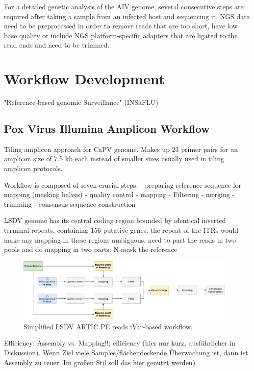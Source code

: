 For a detailed genetic analysis of the AIV genome, several consecutive steps are required after taking a sample from an infected host and sequencing it. NGS data need to be preprocessed in order to remove reads that are too short, have low base quality or include NGS platform-specific adapters that are ligated to the read ends and need to be trimmed.

\section{Workflow Development}
"Reference-based genomic Surveillance" (INSaFLU)

\subsection{Pox Virus Illumina Amplicon Workflow}

Tiling amplicon approach for CaPV genome. Makes up 23 primer pairs for an amplicon size of 7.5 kb each instead of smaller sizes usually used in tiling amplicon protocols.

Workflow is composed of seven crucial steps:
- preparing reference sequence for mapping (masking halves)
- quality control
- mapping
- Filtering
- merging
- trimming
- consensus sequence construction

LSDV genome has its central coding region bounded by identical inverted terminal repeats,
containing 156 putative genes. the repeat of the ITRs would make any mapping in these regions ambiguous.
need to part the reads in two pools and do mapping in two parts: N-mask the  reference 

\begin{figure}
	\centering
	\includegraphics[width=0.97\textwidth]{media/3-pipelines-LSDV.pdf}
	\caption{Simplified LSDV ARTIC PE reads iVar-based workflow.}
	\label{fig:3-pipelines-lsdv}
\end{figure}

Efficiency: Assembly vs. Mapping!!; efficiency (hier nur kurz, ausführlicher in Diskussion). Wenn Ziel viele Samples/flächendeckende Überwachung ist, dann ist Assembly zu teuer. Im großen Stil soll das hier genutzt werden)

